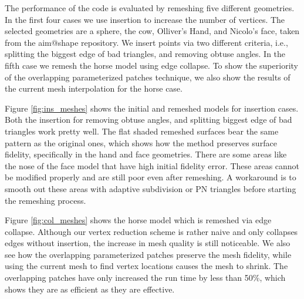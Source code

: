 \documentclass[letter,11pt]{article}
\begin{document}
The performance of the code is evaluated by remeshing five different
geometries. In the first four cases we use insertion to increase the
number of vertices. The selected geometries are a sphere, the cow,
Olliver's Hand, and Nicolo's face, taken from the aim@shape repository.
We insert points via two different criteria, i.e., splitting the
biggest edge of bad triangles, and removing obtuse angles. In the
fifth case we remesh the horse model using edge collapse. To show the
superiority of the overlapping parameterized patches technique, we also
show the results of the current mesh interpolation for the horse case.

Figure \ref{fig:ins_meshes} shows the initial and remeshed models for
insertion cases. Both the insertion for removing obtuse angles, and
splitting biggest edge of bad triangles work pretty well. The flat
shaded remeshed surfaces bear the same pattern as the original ones,
which shows how the method preserves surface fidelity, specifically in
the hand and face geometries. There are some areas like the nose of
the face model that have high initial fidelity error. These areas
cannot be modified properly and are still poor even after remeshing. A
workaround is to smooth out these areas with adaptive subdivision or
PN triangles before starting the remeshing process.

Figure \ref{fig:col_meshes} shows the horse model which is remeshed
via edge collapse. Although our vertex reduction scheme is rather
naive and only collapses edges without insertion, the increase in mesh
quality is still noticeable. We also see how the overlapping
parameterized patches preserve the mesh fidelity, while using the
current mesh to find vertex locations causes the mesh to shrink. The
overlapping patches have only increased the run time by less than
50\%, which shows they are as efficient as they are effective.
\end{document}
